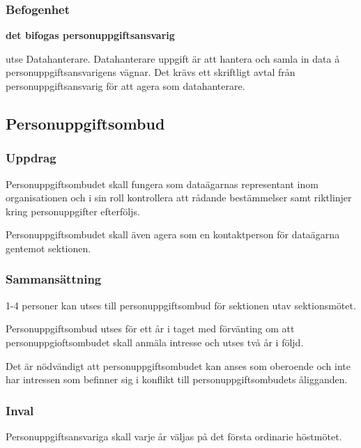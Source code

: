 \subsubsection{Befogenhet}
\textbf{det bifogas personuppgiftsansvarig}
\begin{att}
    \item utse Datahanterare. Datahanterare uppgift är att hantera och samla in data å personuppgiftsansvarigens vägnar. Det krävs ett skriftligt avtal från personuppgiftsansvarig för att agera som datahanterare.
\end{att}

\subsection{Personuppgiftsombud}

\subsubsection{Uppdrag}
 Personuppgiftsombudet skall fungera som dataägarnas representant inom organisationen och i sin roll kontrollera att rådande bestämmelser samt riktlinjer kring personuppgifter efterföljs.
 
 Personuppgiftsombudet skall även agera som en kontaktperson för dataägarna gentemot sektionen.

\subsubsection{Sammansättning}
1-4 personer kan utses till personuppgiftsombud för sektionen utav sektionsmötet.

Personuppgiftsombud utses för ett år i taget med förvänting om att personuppgioftsombudet skall anmäla intresse och utses två år i följd.

Det är nödvändigt att personuppgiftsombudet kan anses som oberoende och inte har intressen som befinner sig i konflikt till personuppgiftsombudets åligganden.

\subsubsection{Inval}
Personuppgiftsansvariga skall varje år väljas på det första ordinarie höstmötet.
